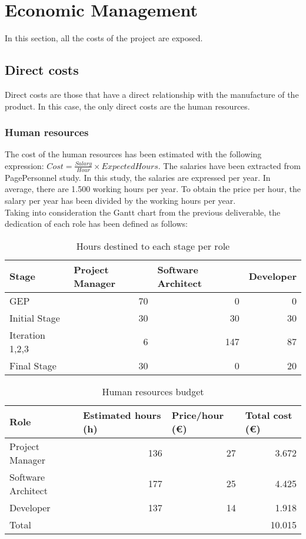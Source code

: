 \chapter{Economic Management}
\label{Chapter4}

In this section, all the costs of the project are exposed. 
\section{Direct costs}
Direct costs are those that have a direct relationship with the manufacture of the product. In this case, the only direct costs are the human resources. 

\subsection{Human resources}
The cost of the human resources has been estimated with the following expression: $Cost = \frac{Salary}{Hour} \times Expected Hours$. The salaries have been extracted from PagePersonnel study\cite{PagePersonnel}. In this study, the salaries are expressed per year. In average, there are 1.500 working hours per year. To obtain the price per hour, the salary per year has been divided by the working hours per year.\\

Taking into consideration the Gantt chart from the previous deliverable, the dedication of each role has been defined as follows:

\begin{table}[h!]
	\centering
	\begin{tabular}{|l|r|r|r|}
		\hline
		Stage & \multicolumn{1}{l|}{Project Manager} & \multicolumn{1}{l|}{Software Architect} & \multicolumn{1}{l|}{Developer} \\ \hline
		GEP & 70 & 0 & 0 \\ \hline
		Initial Stage & 30 & 30 & 30 \\ \hline
		Iteration 1,2,3 & 6 & 147 & 87 \\ \hline
		Final Stage & 30 & 0 & 20 \\ \hline
	\end{tabular}
	\caption{Hours destined to each stage per role}
	\label{StageResources}
\end{table}
\begin{table}[h!]
	\centering
	\begin{tabular}{|l|r|r|r|}
		\hline
		Role & \multicolumn{1}{l|}{Estimated hours (h)} & \multicolumn{1}{l|}{Price/hour (€)} & \multicolumn{1}{l|}{Total cost (€)} \\ \hline
		Project Manager & 136 & 27  & 3.672 \\ \hline
		Software Architect & 177 & 25 & 4.425 \\ \hline
		Developer & 137 & 14 & 1.918 \\ \hline\hline
		Total & \multicolumn{3}{r|}{10.015} \\ \hline
	\end{tabular}
	\caption{Human resources budget}
	\label{HumanResources}
\end{table}

